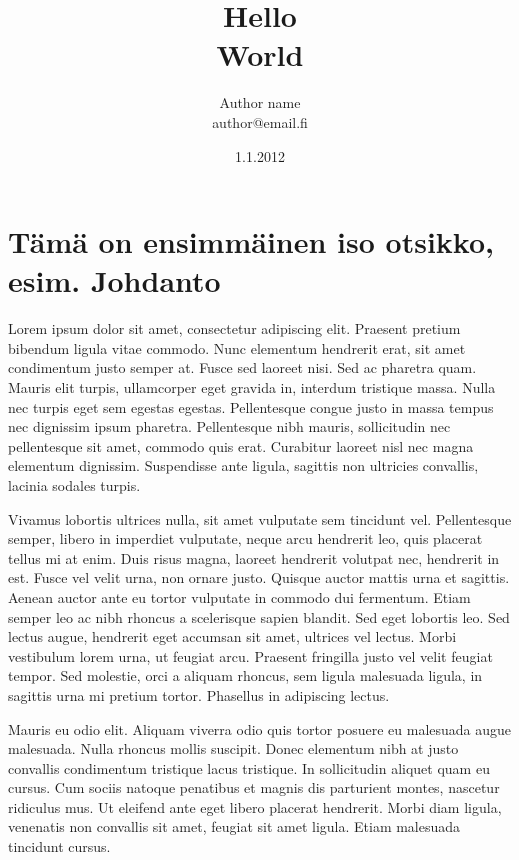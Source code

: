 \documentclass[a4paper]{article}
\begin{document}
\title{\huge Hello \\ \large World}
\date{1.1.2012}
\author{Author name \\ author@email.fi}
\maketitle

\large

\section{Tämä on ensimmäinen iso otsikko, esim. Johdanto}

Lorem ipsum dolor sit amet, consectetur adipiscing elit. Praesent pretium bibendum ligula vitae commodo. Nunc elementum hendrerit erat, sit amet condimentum justo semper at. Fusce sed laoreet nisi. Sed ac pharetra quam. Mauris elit turpis, ullamcorper eget gravida in, interdum tristique massa. Nulla nec turpis eget sem egestas egestas. Pellentesque congue justo in massa tempus nec dignissim ipsum pharetra. Pellentesque nibh mauris, sollicitudin nec pellentesque sit amet, commodo quis erat. Curabitur laoreet nisl nec magna elementum dignissim. Suspendisse ante ligula, sagittis non ultricies convallis, lacinia sodales turpis.

Vivamus lobortis ultrices nulla, sit amet vulputate sem tincidunt vel. Pellentesque semper, libero in imperdiet vulputate, neque arcu hendrerit leo, quis placerat tellus mi at enim. Duis risus magna, laoreet hendrerit volutpat nec, hendrerit in est. Fusce vel velit urna, non ornare justo. Quisque auctor mattis urna et sagittis. Aenean auctor ante eu tortor vulputate in commodo dui fermentum. Etiam semper leo ac nibh rhoncus a scelerisque sapien blandit. Sed eget lobortis leo. Sed lectus augue, hendrerit eget accumsan sit amet, ultrices vel lectus. Morbi vestibulum lorem urna, ut feugiat arcu. Praesent fringilla justo vel velit feugiat tempor. Sed molestie, orci a aliquam rhoncus, sem ligula malesuada ligula, in sagittis urna mi pretium tortor. Phasellus in adipiscing lectus.

Mauris eu odio elit. Aliquam viverra odio quis tortor posuere eu malesuada augue malesuada. Nulla rhoncus mollis suscipit. Donec elementum nibh at justo convallis condimentum tristique lacus tristique. In sollicitudin aliquet quam eu cursus. Cum sociis natoque penatibus et magnis dis parturient montes, nascetur ridiculus mus. Ut eleifend ante eget libero placerat hendrerit. Morbi diam ligula, venenatis non convallis sit amet, feugiat sit amet ligula. Etiam malesuada tincidunt cursus.
\end{document}

